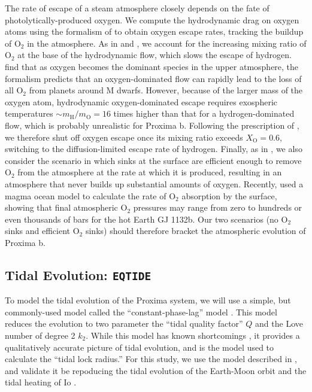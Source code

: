 \documentclass[preprint,12pt]{aastex}
\def\eqtide{\texttt{\footnotesize{EQTIDE}}\xspace}
\begin{document}
The rate of escape of a steam atmosphere closely depends on the fate
of photolytically-produced oxygen. We compute the hydrodynamic drag on
oxygen atoms using the formalism of \cite{Hunten87} to obtain oxygen
escape rates, tracking the buildup of O$_2$ in the atmosphere. As in
\cite{Tian15} and \cite{Schaefer16}, we account for the increasing
mixing ratio of O$_2$ at the base of the hydrodynamic flow, which
slows the escape of hydrogen. \cite{Tian15} find that as oxygen
becomes the dominant species in the upper atmosphere, the
\cite{Hunten87} formalism predicts that an oxygen-dominated flow can
rapidly lead to the loss of all O$_2$ from planets around M
dwarfs. However, because of the larger mass of the oxygen atom,
hydrodynamic oxygen-dominated escape requires exospheric temperatures
$\sim m_\mathrm{H}/m_\mathrm{O} = 16$ times higher than that for a
hydrogen-dominated flow, which is probably unrealistic for Proxima
b. Following the prescription of \cite{Schaefer16}, we therefore
shut off oxygen escape once its mixing ratio exceeds $X_\mathrm{O} =
0.6$, switching to the diffusion-limited escape rate of
hydrogen. Finally, as in \cite{LugerBarnes15}, we also consider the
scenario in which sinks at the surface are efficient enough to remove
O$_2$ from the atmosphere at the rate at which it is produced,
resulting in an atmosphere that never builds up substantial amounts of
oxygen. Recently, \cite{Schaefer16} used a magma ocean model to
calculate the rate of O$_2$ absorption by the surface, showing that
final atmospheric O$_2$ pressures may range from zero to hundreds or
even thousands of bars for the hot Earth GJ 1132b. Our two scenarios
(no O$_2$ sinks and efficient O$_2$ sinks) should therefore bracket
the atmospheric evolution of Proxima b.


\subsection{Tidal Evolution: \eqtide}
\label{sec:models:eqtide}
To model the tidal evolution of the Proxima system, we will use a
simple, but commonly-used model called the ``constant-phase-lag''
model \citep{Goldreich66,Greenberg09,Heller11}. This model reduces the
evolution to two parameter the ``tidal quality factor'' $Q$ and the
Love number of degree 2 $k_2$. While this model has known shortcomings
\citep{ToumaWisdom94,EfroimskyMakarov13}, it provides a qualitatively
accurate picture of tidal evolution, and is the model \cite{Kasting93}
used to calculate the ``tidal lock radius.'' For this study, we use
the model described in \cite{Heller11}, and validate it be repoducing
the tidal evolution of the Earth-Moon orbit \citep{MacDonald64} and
the tidal heating of Io \citep{Peale79}.
\end{document}
